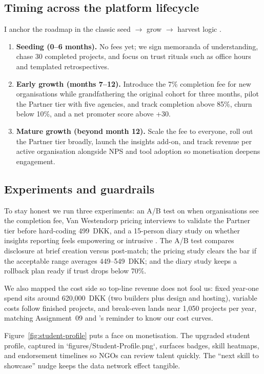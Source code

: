 \subsection*{Timing across the platform lifecycle}
I anchor the roadmap in the classic seed $\rightarrow$ grow $\rightarrow$ harvest logic \citep{Choudary2016}.
\begin{enumerate}
  \item \textbf{Seeding (0--6 months).} No fees yet; we sign memoranda of understanding, chase 30 completed projects, and focus on trust rituals such as office hours and templated retrospectives.
  \item \textbf{Early growth (months 7--12).} Introduce the 7\% completion fee for new organisations while grandfathering the original cohort for three months, pilot the Partner tier with five agencies, and track completion above 85\%, churn below 10\%, and a net promoter score above +30.
  \item \textbf{Mature growth (beyond month 12).} Scale the fee to everyone, roll out the Partner tier broadly, launch the insights add-on, and track revenue per active organisation alongside NPS and tool adoption so monetisation deepens engagement.
\end{enumerate}

\subsection*{Experiments and guardrails}
To stay honest we run three experiments: an A/B test on when organisations see the completion fee, Van Westendorp pricing interviews to validate the Partner tier before hard-coding 499~DKK, and a 15-person diary study on whether insights reporting feels empowering or intrusive \citep{Reillier2017}. The A/B test compares disclosure at brief creation versus post-match; the pricing study clears the bar if the acceptable range averages 449--549~DKK; and the diary study keeps a rollback plan ready if trust drops below 70\%.

We also mapped the cost side so top-line revenue does not fool us: fixed year-one spend sits around 620,000~DKK (two builders plus design and hosting), variable costs follow finished projects, and break-even lands near 1,050 projects per year, matching Assignment~09 and \citet{ShapiroVarian1999}'s reminder to know our cost curves.

Figure~\ref{fig:student-profile} puts a face on monetisation. The upgraded student profile, captured in `figures/Student-Profile.png`, surfaces badges, skill heatmaps, and endorsement timelines so NGOs can review talent quickly. The ``next skill to showcase'' nudge keeps the data network effect tangible.

